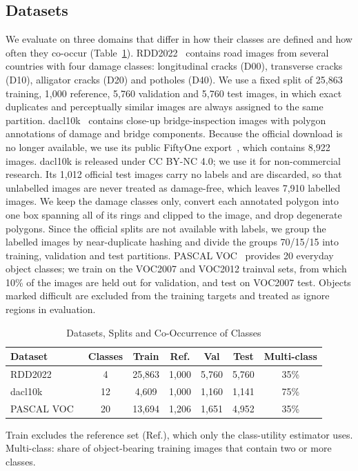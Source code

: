 \documentclass[conference]{IEEEtran}
\begin{document}
\subsection{Datasets}
\label{sec:setup_data}

We evaluate on three domains that differ in how their classes are defined and how often they co-occur (Table~\ref{tab:datasets}). RDD2022~\cite{arya2024rdd} contains road images from several countries with four damage classes: longitudinal cracks (D00), transverse cracks (D10), alligator cracks (D20) and potholes (D40). We use a fixed split of 25,863 training, 1,000 reference, 5,760 validation and 5,760 test images, in which exact duplicates and perceptually similar images are always assigned to the same partition. dacl10k~\cite{flotzinger2024dacl10k} contains close-up bridge-inspection images with polygon annotations of damage and bridge components. Because the official download is no longer available, we use its public FiftyOne export~\cite{voxel51dacl10k}, which contains 8,922 images. dacl10k is released under CC BY-NC 4.0; we use it for non-commercial research. Its 1,012 official test images carry no labels and are discarded, so that unlabelled images are never treated as damage-free, which leaves 7,910 labelled images. We keep the damage classes only, convert each annotated polygon into one box spanning all of its rings and clipped to the image, and drop degenerate polygons. Since the official splits are not available with labels, we group the labelled images by near-duplicate hashing and divide the groups 70/15/15 into training, validation and test partitions. PASCAL VOC~\cite{everingham2010voc} provides 20 everyday object classes; we train on the VOC2007 and VOC2012 trainval sets, from which 10\% of the images are held out for validation, and test on VOC2007 test. Objects marked difficult are excluded from the training targets and treated as ignore regions in evaluation.

\begin{table}[t]
\caption{Datasets, Splits and Co-Occurrence of Classes}
\label{tab:datasets}
\centering
\footnotesize
\setlength{\tabcolsep}{3pt}
\begin{tabular}{@{}lcccccc@{}}
\toprule
\textbf{Dataset} & \textbf{Classes} & \textbf{Train} & \textbf{Ref.} & \textbf{Val} & \textbf{Test} & \textbf{Multi-class} \\
\midrule
RDD2022~\cite{arya2024rdd} & 4 & 25,863 & 1,000 & 5,760 & 5,760 & 35\% \\
dacl10k~\cite{flotzinger2024dacl10k} & 12 & 4,609 & 1,000 & 1,160 & 1,141 & 75\% \\
PASCAL VOC~\cite{everingham2010voc} & 20 & 13,694 & 1,206 & 1,651 & 4,952 & 35\% \\
\bottomrule
\end{tabular}
\vspace{2pt}

\parbox{\columnwidth}{\footnotesize Train excludes the reference set (Ref.), which only the class-utility estimator uses. Multi-class: share of object-bearing training images that contain two or more classes.}
\end{table}
\end{document}
